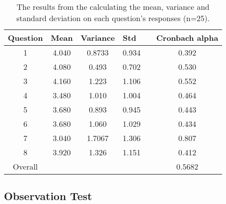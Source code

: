 \begin{table}[H]
\centering
\caption{The results from the calculating the mean, variance and standard deviation on each question's responses (n=25).}
\label{table:questionsCalc}
\begin{tabular}{@{}cccclc@{}}
\toprule
\multicolumn{1}{l}{Question} & \multicolumn{1}{l}{Mean} & \multicolumn{1}{l}{Variance} & \multicolumn{1}{l}{Std} &  & \multicolumn{1}{l}{Cronbach alpha} \\ \midrule
1                            & 4.040                    & 0.8733                       & 0.934                   &  & 0.392                              \\
2                            & 4.080                    & 0.493                        & 0.702                   &  & 0.530                              \\
3                            & 4.160                    & 1.223                        & 1.106                   &  & 0.552                              \\
4                            & 3.480                    & 1.010                        & 1.004                   &  & 0.464                              \\
5                            & 3.680                    & 0.893                        & 0.945                   &  & 0.443                              \\
6                            & 3.680                    & 1.060                        & 1.029                   &  & 0.434                              \\
7                            & 3.040                    & 1.7067                       & 1.306                   &  & 0.807                              \\
8                            & 3.920                    & 1.326                        & 1.151                   &  & 0.412                              \\ \midrule
Overall                        & \multicolumn{1}{l}{}     & \multicolumn{1}{l}{}         & \multicolumn{1}{l}{}    &  & 0.5682                             \\ \bottomrule
\end{tabular}
\end{table}


\subsection{Observation Test}

